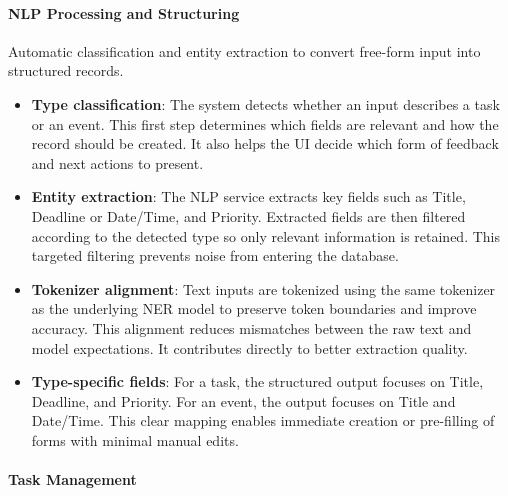 \documentclass[12pt,a4paper]{article}
\begin{document}
\paragraph{NLP Processing and Structuring}\mbox{}

Automatic classification and entity extraction to convert free-form input into structured records.
\begin{itemize}
  \item \textbf{Type classification}: The system detects whether an input describes a task or an event. This first step determines which fields are relevant and how the record should be created. It also helps the UI decide which form of feedback and next actions to present.
  \item \textbf{Entity extraction}: The NLP service extracts key fields such as Title, Deadline or Date/Time, and Priority. Extracted fields are then filtered according to the detected type so only relevant information is retained. This targeted filtering prevents noise from entering the database.
  \item \textbf{Tokenizer alignment}: Text inputs are tokenized using the same tokenizer as the underlying NER model to preserve token boundaries and improve accuracy. This alignment reduces mismatches between the raw text and model expectations. It contributes directly to better extraction quality.
  \item \textbf{Type-specific fields}: For a task, the structured output focuses on Title, Deadline, and Priority. For an event, the output focuses on Title and Date/Time. This clear mapping enables immediate creation or pre-filling of forms with minimal manual edits.
\end{itemize}


\paragraph{Task Management}\mbox{}
\end{document}

